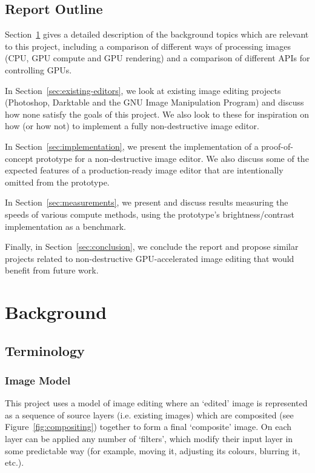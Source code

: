 \documentclass[12pt]{article}
\begin{document}
\subsection{Report Outline}

Section~\ref{sec:background} gives a detailed description of the background topics which are
relevant to this project, including a comparison of different ways of processing images (CPU, GPU
compute and GPU rendering) and a comparison of different APIs for controlling GPUs.

In Section~\ref{sec:existing-editors}, we look at existing image editing projects (Photoshop,
Darktable and the GNU Image Manipulation Program) and discuss how none satisfy the goals of this
project.  We also look to these for inspiration on how (or how not) to implement a fully
non-destructive image editor.

In Section~\ref{sec:implementation}, we present the implementation of a proof-of-concept prototype
for a non-destructive image editor.  We also discuss some of the expected features of a
production-ready image editor that are intentionally omitted from the prototype.

In Section~\ref{sec:measurements}, we present and discuss results measuring the speeds of various
compute methods, using the prototype's brightness/contrast implementation as a benchmark.

Finally, in Section~\ref{sec:conclusion}, we conclude the report and propose similar projects
related to non-destructive GPU-accelerated image editing that would benefit from future work.



\pagebreak

\section{Background}\label{sec:background}

\subsection{Terminology}

\subsubsection{Image Model}

This project uses a model of image editing where an `edited' image is represented as a sequence of
source layers (i.e. existing images) which are composited (see Figure~\ref{fig:compositing})
together to form a final `composite' image.  On each layer can be applied any number of `filters',
which modify their input layer in some predictable way (for example, moving it, adjusting its
colours, blurring it, etc.).
\end{document}
